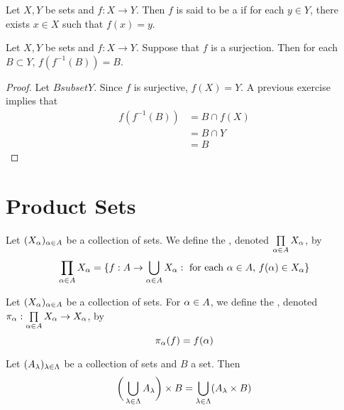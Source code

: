 \documentclass{book}
\begin{document}
	\begin{defn}
		Let $X, Y$ be sets and $f:X \rightarrow Y$. Then $f$ is said to be a  if for each $y \in Y$, there exists $x \in X$ such that $f(x) = y$.
	\end{defn}

	\begin{ex}
			Let $X, Y$ be sets and $f:X \rightarrow Y$. Suppose that $f$ is a surjection. Then for each $B \subset Y$, $f(f^{-1}(B)) = B$. 
	\end{ex}

	\begin{proof}
		Let $B subset Y$. Since $f$ is surjective, $f(X) = Y$. A previous exercise implies that 
		\begin{align*}
			f(f^{-1}(B))
			& = B \cap f(X) \\
			& = B \cap Y \\
			& = B
		\end{align*}
	\end{proof}
	
	\section{Product Sets}
	
	\begin{defn}
	Let $(X_{\alpha})_{\alpha \in A}$ be a collection of sets. We define the , denoted $\prod\limits_{\alpha \in A}X_{\alpha}$, by 
	\begin{equation*}
	\prod_{\alpha \in A}X_{\alpha} = \{f:A \rightarrow \bigcup_{\alpha \in A} X_{\alpha}: \text{ for each $\alpha \in A$, $f(\alpha) \in X_{\alpha}$}\}
	\end{equation*}
	\end{defn}
	
	\begin{defn}
	Let $(X_{\alpha})_{\alpha \in A}$ be a collection of sets.  For $\alpha \in A$, we define the , denoted $\pi_{\alpha}:\prod\limits_{\alpha \in A}X_{\alpha} \rightarrow X_{\alpha}$, by 
	\begin{equation*}
	\pi_{\alpha}(f) = f(\alpha)
	\end{equation*}
	\end{defn}

	\begin{ex}
		Let $(A_{\lambda})_{\lambda \in \Lambda}$ be a collection of sets and $B$ a set. Then 
		$$\bigg( \bigcup\limits_{\lambda \in \Lambda} A_{\lambda} \bigg) \times B = \bigcup\limits_{\lambda \in \Lambda} (A_{\lambda} \times B)$$
	\end{ex}
\end{document}
